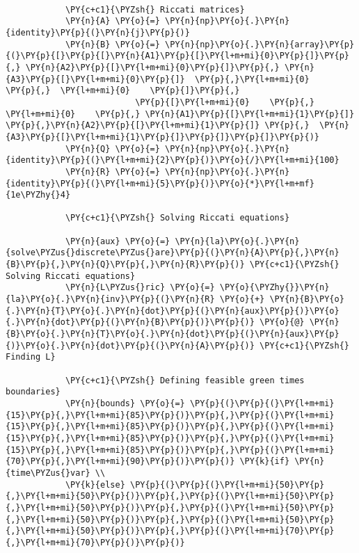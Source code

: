 \begin{Verbatim}[commandchars=\\\{\}]
           
            \PY{c+c1}{\PYZsh{} Riccati matrices}
            \PY{n}{A} \PY{o}{=} \PY{n}{np}\PY{o}{.}\PY{n}{identity}\PY{p}{(}\PY{n}{j}\PY{p}{)}
            \PY{n}{B} \PY{o}{=} \PY{n}{np}\PY{o}{.}\PY{n}{array}\PY{p}{(}\PY{p}{[}\PY{p}{[}\PY{n}{A1}\PY{p}{[}\PY{l+m+mi}{0}\PY{p}{]}\PY{p}{,} \PY{n}{A2}\PY{p}{[}\PY{l+m+mi}{0}\PY{p}{]}\PY{p}{,} \PY{n}{A3}\PY{p}{[}\PY{l+m+mi}{0}\PY{p}{]}  \PY{p}{,}\PY{l+m+mi}{0}     \PY{p}{,}  \PY{l+m+mi}{0}    \PY{p}{]}\PY{p}{,}
                          \PY{p}{[}\PY{l+m+mi}{0}    \PY{p}{,} \PY{l+m+mi}{0}    \PY{p}{,} \PY{n}{A1}\PY{p}{[}\PY{l+m+mi}{1}\PY{p}{]}  \PY{p}{,}\PY{n}{A2}\PY{p}{[}\PY{l+m+mi}{1}\PY{p}{]} \PY{p}{,}  \PY{n}{A3}\PY{p}{[}\PY{l+m+mi}{1}\PY{p}{]}\PY{p}{]}\PY{p}{]}\PY{p}{)}
            \PY{n}{Q} \PY{o}{=} \PY{n}{np}\PY{o}{.}\PY{n}{identity}\PY{p}{(}\PY{l+m+mi}{2}\PY{p}{)}\PY{o}{/}\PY{l+m+mi}{100}
            \PY{n}{R} \PY{o}{=} \PY{n}{np}\PY{o}{.}\PY{n}{identity}\PY{p}{(}\PY{l+m+mi}{5}\PY{p}{)}\PY{o}{*}\PY{l+m+mf}{1e\PYZhy{}4}
        
            \PY{c+c1}{\PYZsh{} Solving Riccati equations}
        
            \PY{n}{aux} \PY{o}{=} \PY{n}{la}\PY{o}{.}\PY{n}{solve\PYZus{}discrete\PYZus{}are}\PY{p}{(}\PY{n}{A}\PY{p}{,}\PY{n}{B}\PY{p}{,}\PY{n}{Q}\PY{p}{,}\PY{n}{R}\PY{p}{)} \PY{c+c1}{\PYZsh{} Solving Riccati equations}
            \PY{n}{L\PYZus{}ric} \PY{o}{=} \PY{o}{\PYZhy{}}\PY{n}{la}\PY{o}{.}\PY{n}{inv}\PY{p}{(}\PY{n}{R} \PY{o}{+} \PY{n}{B}\PY{o}{.}\PY{n}{T}\PY{o}{.}\PY{n}{dot}\PY{p}{(}\PY{n}{aux}\PY{p}{)}\PY{o}{.}\PY{n}{dot}\PY{p}{(}\PY{n}{B}\PY{p}{)}\PY{p}{)} \PY{o}{@} \PY{n}{B}\PY{o}{.}\PY{n}{T}\PY{o}{.}\PY{n}{dot}\PY{p}{(}\PY{n}{aux}\PY{p}{)}\PY{o}{.}\PY{n}{dot}\PY{p}{(}\PY{n}{A}\PY{p}{)} \PY{c+c1}{\PYZsh{} Finding L}
        
            \PY{c+c1}{\PYZsh{} Defining feasible green times boundaries}
            \PY{n}{bounds} \PY{o}{=} \PY{p}{(}\PY{p}{(}\PY{l+m+mi}{15}\PY{p}{,}\PY{l+m+mi}{85}\PY{p}{)}\PY{p}{,}\PY{p}{(}\PY{l+m+mi}{15}\PY{p}{,}\PY{l+m+mi}{85}\PY{p}{)}\PY{p}{,}\PY{p}{(}\PY{l+m+mi}{15}\PY{p}{,}\PY{l+m+mi}{85}\PY{p}{)}\PY{p}{,}\PY{p}{(}\PY{l+m+mi}{15}\PY{p}{,}\PY{l+m+mi}{85}\PY{p}{)}\PY{p}{,}\PY{p}{(}\PY{l+m+mi}{70}\PY{p}{,}\PY{l+m+mi}{90}\PY{p}{)}\PY{p}{)} \PY{k}{if} \PY{n}{time\PYZus{}var} \\
            \PY{k}{else} \PY{p}{(}\PY{p}{(}\PY{l+m+mi}{50}\PY{p}{,}\PY{l+m+mi}{50}\PY{p}{)}\PY{p}{,}\PY{p}{(}\PY{l+m+mi}{50}\PY{p}{,}\PY{l+m+mi}{50}\PY{p}{)}\PY{p}{,}\PY{p}{(}\PY{l+m+mi}{50}\PY{p}{,}\PY{l+m+mi}{50}\PY{p}{)}\PY{p}{,}\PY{p}{(}\PY{l+m+mi}{50}\PY{p}{,}\PY{l+m+mi}{50}\PY{p}{)}\PY{p}{,}\PY{p}{(}\PY{l+m+mi}{70}\PY{p}{,}\PY{l+m+mi}{70}\PY{p}{)}\PY{p}{)}
        

\end{Verbatim}
